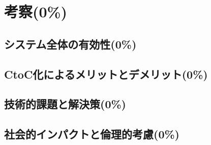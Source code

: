 \section{考察(0\%)}
  \label{sec:考察}
  
  \subsection{システム全体の有効性(0\%)}
    \label{sec:システム全体の有効性}
      \par
      
  \subsection{CtoC化によるメリットとデメリット(0\%)}
    \label{sec:CtoC化によるメリットとデメリット}
      \par
      
  \subsection{技術的課題と解決策(0\%)}
    \label{sec:技術的課題と解決策}
      \par
      
  \subsection{社会的インパクトと倫理的考慮(0\%)}
    \label{sec:社会的インパクトと倫理的考慮}
      \par
